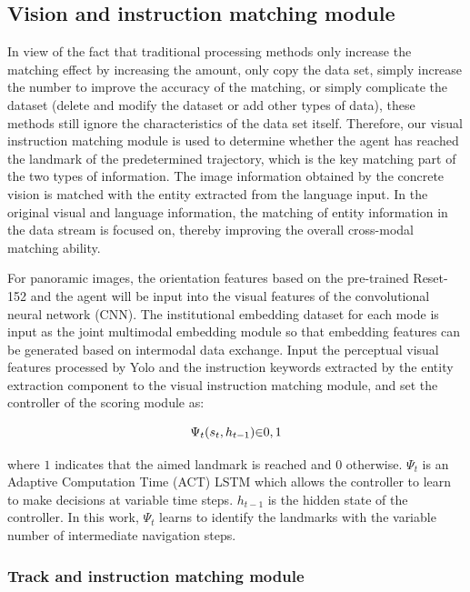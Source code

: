 \subsection{Vision and instruction matching module}
	
In view of the fact that traditional processing methods only increase the matching effect by increasing the amount, only copy the data set, simply increase the number to improve the accuracy of the matching, or simply complicate the dataset (delete and modify the dataset or add other types of data), these methods still ignore the characteristics of the data set itself. Therefore, our visual instruction matching module is used to determine whether the agent has reached the landmark of the predetermined trajectory, which is the key matching part of the two types of information. The image information obtained by the concrete vision is matched with the entity extracted from the language input. In the original visual and language information, the matching of entity information in the data stream is focused on, thereby improving the overall cross-modal matching ability.
	
For panoramic images, the orientation features based on the pre-trained Reset-152 and the agent will be input into the visual features of the convolutional neural network (CNN). The institutional embedding dataset for each mode is input as the joint multimodal embedding module so that embedding features can be generated based on intermodal data exchange. Input the perceptual visual features processed by Yolo and the instruction keywords extracted by the entity extraction component to the visual instruction matching module, and set the controller of the scoring module as:

\begin{equation}
	\centering
	{\Psi}_{t}({s}_{t},{h}_{t-1}){\in}{{0},{1}}
\end{equation}

where ${1}$ indicates that the aimed landmark is reached and ${0}$ otherwise. ${{\Psi}_{t}}$ is an Adaptive Computation Time (ACT) LSTM which allows the controller to learn to make decisions at variable time steps. ${h}_{t-1}$ is the hidden state of the controller. In this work, ${{\Psi}_{t}}$ learns to identify the landmarks with the variable number of intermediate navigation steps.

\subsubsection{Track and instruction matching module}

